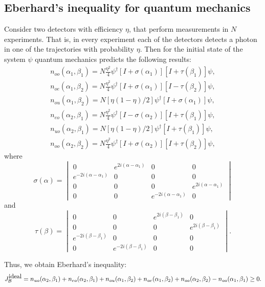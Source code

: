 \documentclass[11pt]{article}
\begin{document}
\subsection{Eberhard's inequality for quantum mechanics}
Consider two detectors with efficiency $\eta$, that perform measurements in $N$ experiments. That is, in every experiment each of the detectors detects a photon in one of the trajectories with probability $\eta$. Then for the initial state of the system $\psi$ quantum mechanics predicts the following results:
\begin{eqnarray} \label{eq:Eberhard_n_start}
n_{oo}(\alpha_1, \beta_1) = N\frac{\eta^2}{4}\psi^\dagger[I + \sigma(\alpha_1)][I + \tau(\beta_1)]\psi,\\
n_{oe}(\alpha_1, \beta_2) = N\frac{\eta^2}{4}\psi^\dagger[I + \sigma(\alpha_1)][I - \tau(\beta_2)]\psi,\\
n_{ou}(\alpha_1, \beta_2) = N[\eta(1 - \eta)/2]\psi^\dagger[I + \sigma(\alpha_1)]\psi,\\ \label{eq:Eberhard_n_ou}
n_{eo}(\alpha_2, \beta_1) = N\frac{\eta^2}{4}\psi^\dagger[I - \sigma(\alpha_2)][I + \tau(\beta_1)]\psi,\\
n_{uo}(\alpha_2, \beta_1) = N[\eta(1 - \eta)/2]\psi^\dagger[I + \tau(\beta_1)]\psi,\\ \label{eq:Eberhard_n_uo}
n_{oo}(\alpha_2, \beta_2) = N\frac{\eta^2}{4}\psi^\dagger[I + \sigma(\alpha_2)][I + \tau(\beta_2)]\psi, \label{eq:Eberhard_n_finish}
\end{eqnarray}
where 
\[
\sigma(\alpha) = 
\begin{vmatrix}
0 & e^{2i(\alpha - \alpha_1)} & 0 & 0\\
e^{-2i(\alpha - \alpha_1)} & 0 & 0 & 0\\
0 & 0 & 0 & e^{2i(\alpha - \alpha_1)}\\
0 & 0 & e^{-2i(\alpha - \alpha_1)} & 0
\end{vmatrix}
\] 
and
\[
\tau(\beta) = 
\begin{vmatrix}
0 & 0 & e^{2i(\beta - \beta_1)} & 0\\
0 & 0 & 0 & e^{2i(\beta - \beta_1)}\\
e^{-2i(\beta - \beta_1)} & 0 & 0 & 0\\
0 & e^{-2i(\beta - \beta_1)} & 0 & 0
\end{vmatrix}.
\]

Thus, we obtain Eberhard's inequality:
\[
J_{\mathcal{B}}^{\mbox{ideal}} = n_{uo}(\alpha_2, \beta_1) + n_{eo}(\alpha_2, \beta_1) + n_{ou}(\alpha_1, \beta_2) \\
+ n_{oe}(\alpha_1, \beta_2) + n_{oo}(\alpha_2, \beta_2) - n_{oo}(\alpha_1, \beta_1) \geq 0.
\]
\end{document}
